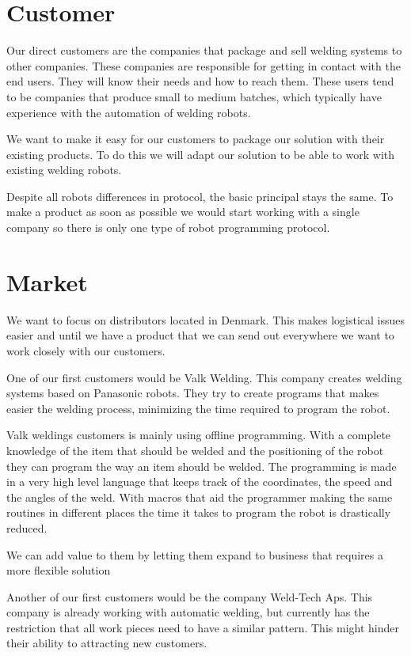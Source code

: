 \section{Customer}
Our direct customers are the companies that package and sell welding systems to other companies. 
These companies are responsible for getting in contact with the end users. 
They will know their needs and how to reach them. 
These users tend to be companies that produce small to medium batches, which typically have experience with the automation of welding robots.

We want to make it easy for our customers to package our solution with their existing products.
To do this we will adapt our solution to be able to work with existing welding robots.

Despite all robots differences in protocol, the basic principal stays the same.
To make a product as soon as possible we would start working with a single company so there is only one type of robot programming protocol.

\section{Market}
We want to focus on distributors located in Denmark.
This makes logistical issues easier and until we have a product that we can send out everywhere we want to work closely with our customers.

One of our first customers would be Valk Welding. This company creates welding systems based on Panasonic robots. They try to create programs that makes easier the welding process, minimizing the time required to program the robot.

Valk weldings customers is mainly using offline programming.
With a complete knowledge of the item that should be welded and the positioning of the robot they can program the way an item should be welded.
The programming is made in a very high level language that keeps track of the coordinates, the speed and the angles of the weld.
With macros that aid the programmer making the same routines in different places the time it takes to program the robot is drastically reduced.

We can add value to them by letting them expand to business that requires a more flexible solution

Another of our first customers would be the company Weld-Tech Aps. 
This company is already working with automatic welding, but currently has the restriction that all work pieces need to have a similar pattern. 
This might hinder their ability to attracting new customers.

